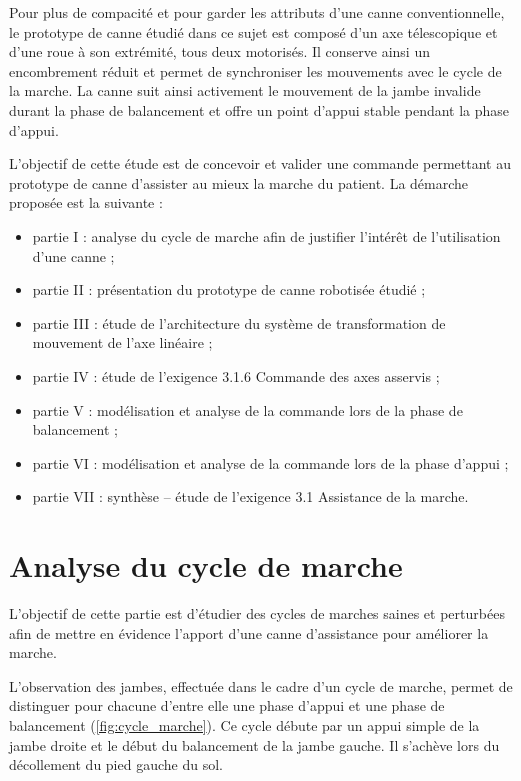 \vspace{-0.25cm}
Pour plus de compacité et pour garder les attributs d'une canne conventionnelle, le prototype de canne étudié dans ce sujet est composé d'un axe télescopique et d'une roue à son extrémité, tous deux motorisés. Il conserve ainsi un encombrement réduit et permet de synchroniser les mouvements avec le cycle de la marche. La canne suit ainsi activement le mouvement de la jambe \og invalide\fg{} durant la phase de balancement et offre un point d'appui stable pendant la phase d'appui.


L'objectif de cette étude est de concevoir et valider une commande permettant au prototype de canne d'assister au mieux la marche du patient.
La démarche proposée est la suivante : 
\begin{itemize}
\item partie I : analyse du cycle de marche afin de justifier l'intérêt de l'utilisation d'une canne ; 
\item partie II : présentation du prototype de canne robotisée étudié ;
\item partie III : étude de l'architecture du système de transformation de mouvement de l'axe linéaire ;
\item partie IV : étude de l'exigence 3.1.6 \og Commande des axes asservis\fg{} ;
\item partie V : modélisation et analyse de la commande lors de la phase de balancement ; 
\item partie VI : modélisation et analyse de la commande lors de la phase d'appui ;
\item partie VII : synthèse -- étude de l'exigence 3.1 \og Assistance de la marche\fg{}.
\end{itemize}


\section{Analyse du cycle de marche}
L'objectif de cette partie est d'étudier des cycles de marches saines et perturbées afin de mettre en évidence l'apport d'une canne d'assistance pour améliorer la marche.


L'observation des jambes, effectuée dans le cadre d'un \og cycle de marche\fg{}, permet de distinguer pour chacune d'entre elle une phase d'appui et une phase de balancement (\ref{fig:cycle_marche}). Ce cycle débute par un appui simple de la jambe droite et le début du balancement de la jambe gauche. Il s'achève lors du décollement du pied gauche du sol.


